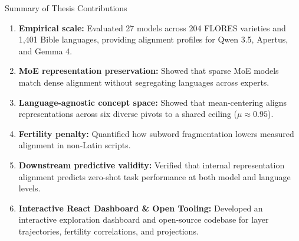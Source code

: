 \documentclass[
  english,
  aspectratio=169,
]{tumbeamer}
\begin{document}
\begin{frame}{Summary of Thesis Contributions}
  \begin{enumerate}\small \setlength{\itemsep}{1.5pt}
    \item \textbf{Empirical scale:} Evaluated 27 models across 204 FLORES varieties and 1,401 Bible languages, providing alignment profiles for Qwen 3.5, Apertus, and Gemma 4.
    \item \textbf{MoE representation preservation:} Showed that sparse MoE models match dense alignment without segregating languages across experts.
    \item \textbf{Language-agnostic concept space:} Showed that mean-centering aligns representations across six diverse pivots to a shared ceiling ($\mu \approx 0.95$).
    \item \textbf{Fertility penalty:} Quantified how subword fragmentation lowers measured alignment in non-Latin scripts.
    \item \textbf{Downstream predictive validity:} Verified that internal representation alignment predicts zero-shot task performance at both model and language levels.
    \item \textbf{Interactive React Dashboard \& Open Tooling:} Developed an interactive exploration dashboard and open-source codebase for layer trajectories, fertility correlations, and projections.
  \end{enumerate}
\end{frame}
\end{document}
